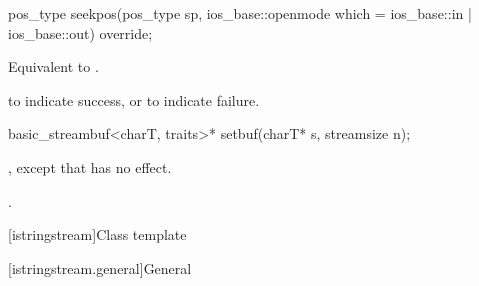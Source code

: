 %
\begin{itemdecl}
pos_type seekpos(pos_type sp,
                 ios_base::openmode which
                   = ios_base::in | ios_base::out) override;
\end{itemdecl}

\begin{itemdescr}
\pnum
\effects
Equivalent to .

\pnum
\returns
{}
to indicate success, or
to indicate failure.
\end{itemdescr}

%
\begin{itemdecl}
basic_streambuf<charT, traits>* setbuf(charT* s, streamsize n);
\end{itemdecl}

\begin{itemdescr}
\pnum
\effects
{},
except that
has no effect.

\pnum
\returns
{}.
\end{itemdescr}

[istringstream]{Class template }

[istringstream.general]{General}

